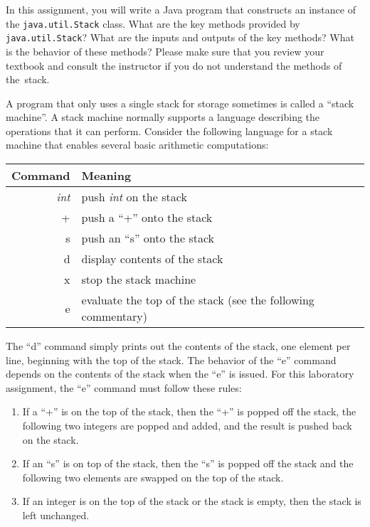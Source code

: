 In this assignment, you will write a Java program that constructs an instance of the {\tt java.util.Stack} class. What
are the key methods provided by {\tt java.util.Stack}? What are the inputs and outputs of the key methods? What is the
behavior of these methods? Please make sure that you review your textbook and consult the instructor if you do not
understand the methods of \mbox{the stack}.

A program that only uses a single stack for storage sometimes is called a ``stack machine''. A stack machine normally
supports a language describing the operations that it can perform. Consider the following language for a stack machine
that enables several basic arithmetic computations:

\begin{tabular}{r | l}
  Command & Meaning \\ \hline
  \emph{int} & push \emph{int} on the stack \\
  + & push a ``+'' onto the stack \\
  s & push an ``s'' onto the stack \\
  d & display contents of the stack \\
  x & stop the stack machine \\
  e & evaluate the top of the stack (see the following commentary) \\
\end{tabular}

The ``d'' command simply prints out the contents of the stack, one element per line, beginning with the top of the
stack. The behavior of the ``e'' command depends on the contents of the stack when the ``e'' is issued. For this
laboratory assignment, the ``e'' command must follow these rules:

\begin{enumerate}

  \item If a ``+'' is on the top of the stack, then the ``+'' is popped off the stack, the following two integers are
    popped and added, and the result is pushed back on the stack.

  \item If an ``s'' is on top of the stack, then the ``s'' is popped off the stack and the following two elements are
    swapped on the top of the stack.

  \item If an integer is on the top of the stack or the stack is empty, then the stack is left unchanged.

\end{enumerate}

